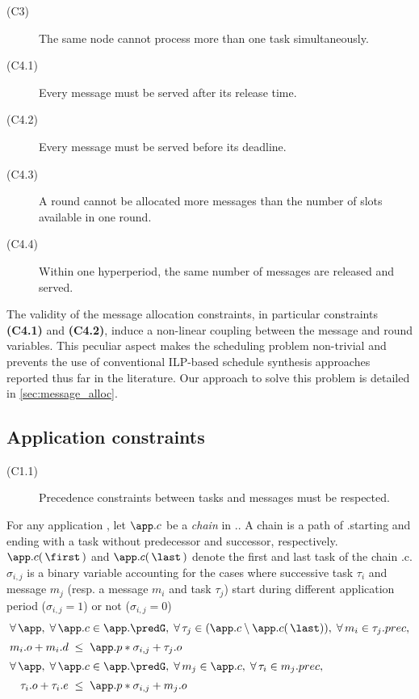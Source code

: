 		\begin{description}
			\item[(C3)] The same node cannot process more than one task simultaneously.
		\end{description}

		\begin{description}
			\item[(C4.1)] Every message must be served
			after its release time.
			\item[(C4.2)] Every message must be served
			before its deadline.
			\item[(C4.3)] A round cannot be allocated more messages than the number of slots available in one round.
			\item[(C4.4)] Within one hyperperiod, the same number of messages are released and served.
		\end{description}

The validity of the message allocation constraints, in particular constraints \textbf{(C4.1)} and \textbf{(C4.2)}, induce a non-linear coupling between the message and round variables. This peculiar aspect makes the scheduling problem non-trivial and prevents the use of conventional ILP-based schedule synthesis approaches reported thus far in the literature.
Our approach to solve this problem is detailed in \cref{sec:message_alloc}.


\subsection*{Application constraints}\label{sec;application}
\begin{description}
	\item[(C1.1)]Precedence constraints between tasks and messages must be respected.
\end{description}
For any application \app, let $\app.c$ be a \emph{chain} in \app.\predG. A chain is a path of \app.\predG starting and ending with a task without predecessor and successor, respectively. $\app.c(\,\first\,)$ and $\app.c(\,\last\,)$ denote the first and last task of the chain \app.c.  $\sigma_{i,j}$ is a binary variable accounting for the cases where successive task $\tau_i$ and message $m_j$ (resp. a message $m_i$ and task $\tau_j$) start during different application period ($\sigma_{i,j} = 1$) or not ($\sigma_{i,j} = 0$)
\begin{align}
\intertext{%
$	\forall\, \app, \;
	\forall\, \app.c \in \app.\predG, \;
	\forall\, \tau_j \in (\app.c \setminus \app.c(\,\last)),\;
	\forall\, m_i \in \tau_j.prec,
	$}
		m_i.o + m_i.d
		&\;\leq\; \app.p * \sigma_{i,j} + \tau_j.o\\
\intertext{%
$	\forall\, \app, \;
	\forall\, \app.c \in \app.\predG, \;
	\forall\, m_j \in \app.c,\;
	\forall\, \tau_i \in m_j.prec,
	$}
		\tau_i.o + \tau_i.e
		&\;\leq\; \app.p * \sigma_{i,j} + m_j.o
\end{align}

